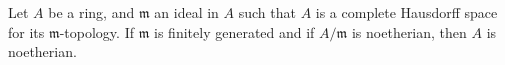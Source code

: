 Let $A$ be a ring, and $\mathfrak{m}$ an ideal in $A$ such that $A$ is a complete Hausdorff space for its $\mathfrak{m}$-topology. If $\mathfrak{m}$ is finitely generated and if $A/\mathfrak{m}$ is noetherian, then $A$ is noetherian.